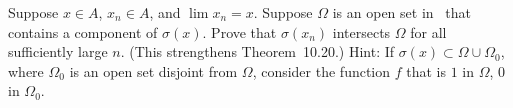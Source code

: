 \begin{enumerate}
\begin{excopy}
Suppose \(x \in A\), \(x_n \in A\), and \(\lim x_n = x\).
  Suppose \(\Omega\) is an open set in \C\ that
contains a component of \(\sigma(x)\).
  Prove that \(\sigma(x_n)\) intersects \(\Omega\) for all sufficiently
large $n$. (This strengthens Theorem~10.20.) Hint:
  If \(\sigma(x) \subset \Omega \cup \Omega_0\), where \(\Omega_0\) is
an open set disjoint from \(\Omega\),
  consider the function $f$ that is $1$ in \(\Omega\), $0$ in \(\Omega_0\).
\end{excopy}
\unfinished

\begin{excopy}
\end{excopy}
\unfinished

\end{enumerate}

